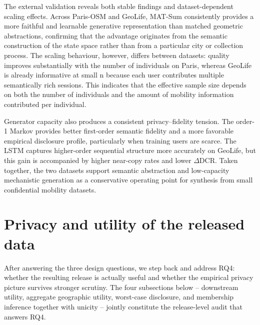 \documentclass[sigconf,nonacm]{acmart}
\begin{document}
The external validation reveals both stable findings and dataset-dependent scaling effects. Across Paris-OSM and GeoLife, MAT-Sum consistently provides a more faithful and learnable generative representation than matched geometric abstractions, confirming that the advantage originates from the semantic construction of the state space rather than from a particular city or collection process. The scaling behaviour, however, differs between datasets: quality improves substantially with the number of individuals on Paris, whereas GeoLife is already informative at small n because each user contributes multiple semantically rich sessions. This indicates that the effective sample size depends on both the number of individuals and the amount of mobility information contributed per individual.

Generator capacity also produces a consistent privacy–fidelity tension. The order-1 Markov provides better first-order semantic fidelity and a more favorable empirical disclosure profile, particularly when training users are scarce. The LSTM captures higher-order sequential structure more accurately on GeoLife, but this gain is accompanied by higher near-copy rates and lower $\Delta$DCR. Taken together, the two datasets support semantic abstraction and low-capacity mechanistic generation as a conservative operating point for synthesis from small confidential mobility datasets.


\section{Privacy and utility of the released data}
\label{sec:privacy-utility}

After answering the three design questions, we step back and address RQ4: whether the resulting release is actually useful and whether the empirical privacy picture survives stronger scrutiny. The four subsections below -- downstream utility, aggregate geographic utility, worst-case disclosure, and membership inference together with unicity -- jointly constitute the release-level audit that answers RQ4.
\end{document}

